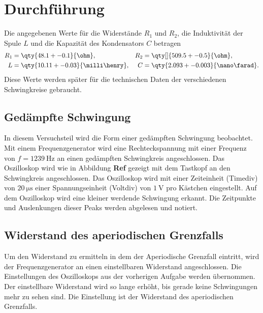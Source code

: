 \section{Durchführung}

Die angegebenen Werte für die Widerstände $R_1$ und $R_2$, die Induktivität der Spule $L$ und die Kapazität des Kondensators $C$ betragen
\begin{align*}
    R_1 &= \qty{48.1 +- 0.1 }{\ohm}, & R_2 &= \qty[]{509.5 +- 0.5}{\ohm}, \\
    L &= \qty{10.11 +- 0.03}{\milli \henry}, & C &= \qty{2.093 +- 0.003}{\nano \farad}.
\end{align*}
%
Diese Werte werden später für die technischen Daten der verschiedenen Schwingkreise gebraucht.

\subsection{Gedämpfte Schwingung}
In diesem Versuchsteil wird die Form einer gedämpften Schwingung beobachtet.
Mit einem Frequenzgenerator wird eine Rechteckspannung mit einer Frequenz von 
$f = \qty{1239}{\hertz}$ an einen gedämpften Schwingkreis angeschlossen.
Das Oszilloskop wird wie in Abbildung \textbf{Ref} gezeigt mit dem 
Tastkopf an den Schwingkreis angeschlossen.
Das Oszilloskop wird mit einer Zeiteinheit (Timediv) von $\qty{20}{\micro\s}$
einer Spannungseinheit (Voltdiv) von $\qty{1}{\volt}$ pro Kästchen eingestellt.
Auf dem Oszilloskop wird eine kleiner werdende Schwingung erkannt.
Die Zeitpunkte und Auslenkungen dieser Peaks werden abgelesen und notiert.

\subsection{Widerstand des aperiodischen Grenzfalls}
Um den Widerstand zu ermitteln in dem der Aperiodische Grenzfall eintritt,
wird der Frequenzgenerator an einen einstellbaren Widerstand angeschlossen.
Die Einstellungen des Oszilloskops aus der vorherigen Aufgabe werden übernommen.
Der einstellbare Widerstand wird so lange erhöht, bis gerade keine Schwingungen mehr zu sehen sind.
Die Einstellung ist der Widerstand des aperiodischen Grenzfalls.


